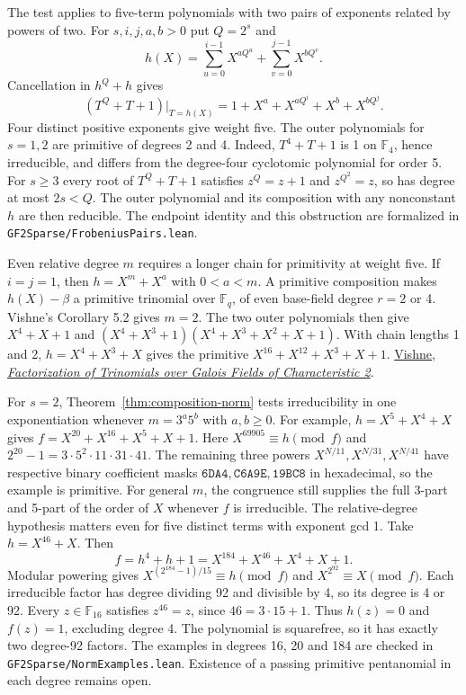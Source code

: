 \documentclass[11pt]{article}
\begin{document}
The test applies to five-term polynomials with two pairs of exponents
related by powers of two. For \(s,i,j,a,b>0\) put \(Q=2^s\) and
\[
 h(X)=\sum_{u=0}^{i-1}X^{aQ^u}+\sum_{v=0}^{j-1}X^{bQ^v}.
\]
Cancellation in \(h^Q+h\) gives
\[
 (T^Q+T+1)\big|_{T=h(X)}=1+X^a+X^{aQ^i}+X^b+X^{bQ^j}.
\]
Four distinct positive exponents give weight five. The outer
polynomials for \(s=1,2\) are primitive of degrees 2 and 4.
Indeed, \(T^4+T+1\) is 1 on \(\mathbb F_4\), hence irreducible,
and differs from the degree-four cyclotomic polynomial for order 5.
For \(s\ge3\) every root of \(T^Q+T+1\) satisfies
\(z^Q=z+1\) and \(z^{Q^2}=z\), so has degree at most \(2s<Q\).
The outer polynomial and its composition with any nonconstant \(h\)
are then reducible. The endpoint identity and this obstruction are
formalized in \texttt{GF2Sparse/FrobeniusPairs.lean}.

Even relative degree \(m\) requires a longer chain for primitivity at
weight five. If \(i=j=1\), then \(h=X^m+X^a\) with \(0<a<m\).
A primitive composition makes \(h(X)-\beta\) a primitive trinomial
over \(\mathbb F_q\), of even base-field degree \(r=2\) or 4.
Vishne's Corollary 5.2 gives \(m=2\). The two outer polynomials
then give \(X^4+X+1\) and
\((X^4+X^3+1)(X^4+X^3+X^2+X+1)\).
With chain lengths 1 and 2, \(h=X^4+X^3+X\) gives the primitive
\(X^{16}+X^{12}+X^3+X+1\).
\href{https://u.math.biu.ac.il/~vishneu/publications/trinomials.pdf}
{Vishne, \emph{Factorization of Trinomials over Galois Fields of Characteristic 2}}.

For \(s=2\), Theorem~\ref{thm:composition-norm} tests irreducibility
in one exponentiation whenever \(m=3^a5^b\) with \(a,b\ge0\).
For example, \(h=X^5+X^4+X\) gives
\(f=X^{20}+X^{16}+X^5+X+1\).
Here \(X^{69905}\equiv h\pmod f\) and
\(2^{20}-1=3\cdot5^2\cdot11\cdot31\cdot41\). The remaining
three powers \(X^{N/11},X^{N/31},X^{N/41}\) have respective
binary coefficient masks \(\mathtt{6DA4},\mathtt{C6A9E},\mathtt{19BC8}\)
in hexadecimal, so the example is primitive.
For general \(m\), the congruence still supplies the full 3-part and
5-part of the order of \(X\) whenever \(f\) is irreducible.
The relative-degree hypothesis matters even for five distinct terms
with exponent gcd 1. Take \(h=X^{46}+X\). Then
\[
 f=h^4+h+1=X^{184}+X^{46}+X^4+X+1.
\]
Modular powering gives \(X^{(2^{184}-1)/15}\equiv h\pmod f\) and
\(X^{2^{92}}\equiv X\pmod f\). Each irreducible factor has degree
dividing 92 and divisible by 4, so its degree is 4 or 92.
Every \(z\in\mathbb F_{16}\) satisfies \(z^{46}=z\), since
\(46=3\cdot15+1\). Thus \(h(z)=0\) and \(f(z)=1\), excluding
degree 4. The polynomial is squarefree, so it has exactly two
degree-92 factors. The examples in degrees 16, 20 and 184 are checked in
\texttt{GF2Sparse/NormExamples.lean}.
Existence of a passing primitive pentanomial in each degree remains open.
\end{document}
